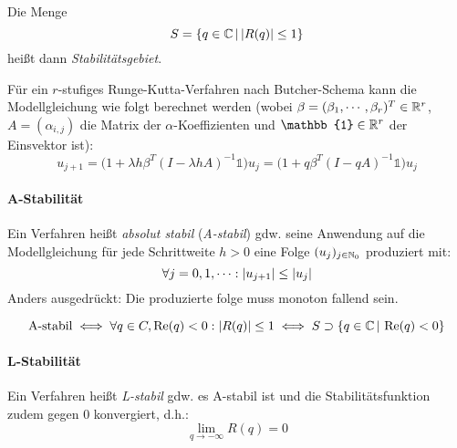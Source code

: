		        Die Menge \[ S = \{ q \in \mathbb{C} \,\vert\, \abs{R(q)} \leq 1 \} \] heißt dann \textit{Stabilitätsgebiet}.
		        
		        Für ein \(r\)-stufiges Runge-Kutta-Verfahren nach Butcher-Schema kann die Modellgleichung wie folgt berechnet werden (wobei \( \beta = (\beta_1, \cdots, \beta_r)^T \in \mathbb{R}^r \), \( A = (\alpha_{i,j}) \) die Matrix der \(\alpha\)-Koeffizienten und \( \mathbb{1} \in \R^r \) der Einsvektor ist):
		        \begin{equation*}
			        u_{j+1} = \big( 1 + \lambda h \beta^T (I - \lambda h A)^{-1} \mathbb{1} \big) u_j = \big( 1 + q \beta^T (I - qA)^{-1} \mathbb{1} \big) u_j
		        \end{equation*}
        
	        \paragraph{A-Stabilität}
	            Ein Verfahren heißt \textit{absolut stabil} (\textit{A-stabil}) gdw. seine Anwendung auf die Modellgleichung für jede Schrittweite \( h > 0 \) eine Folge \( (u_j)_{j \in \mathbb{N}_0} \) produziert mit:
	            \begin{equation*}
		            \forall j = 0, 1, \cdots : \abs{u_{j+1}} \leq \abs{u_j}
	            \end{equation*}
	            Anders ausgedrückt: Die produzierte folge muss monoton fallend sein.
	            
	            \begin{equation*}
		            \textrm{A-stabil} \iff \forall q \in C, \Re(q) < 0 : \abs{R(q)} \leq 1 \iff S \supset \{ q \in \mathbb{C} \,\vert\, \Re(q) < 0 \}
	            \end{equation*}
	        
	        \paragraph{L-Stabilität}
		        Ein Verfahren heißt \textit{L-stabil} gdw. es A-stabil ist und die Stabilitätsfunktion zudem gegen \(0\) konvergiert, d.h.:
		        \begin{equation*}
			        \lim\limits_{q \rightarrow -\infty} R(q) = 0
		        \end{equation*}

